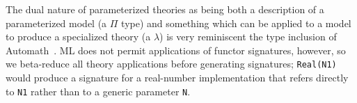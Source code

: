 The dual nature of parameterized theories as being both a description
of a parameterized model (a $\Pi$ type) and something which can be
applied to a model to produce a specialized theory (a $\lambda$) is
very reminiscent the type inclusion of Automath~\cite{automath}.  ML
does not permit applications of functor signatures, however, so we
beta-reduce all theory applications before generating signatures;
\Verb|Real(N1)| would produce a signature for a real-number
implementation that refers directly to \Verb|N1| rather than to a
generic parameter \Verb|N|.


